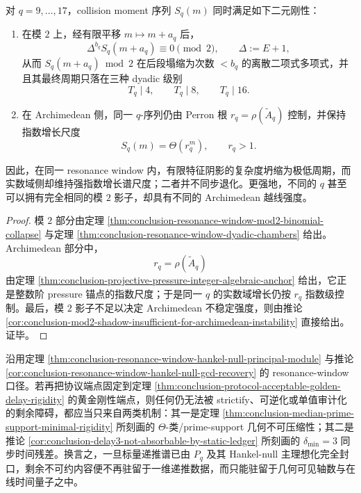 \begin{theorem}\label{thm:conclusion-resonance-window-archimedean-mod2-complexity-splitting}
对 \(q=9,\dots,17\)，collision moment 序列 \(S_q(m)\) 同时满足如下二元刚性：
\begin{enumerate}
\item 在模 \(2\) 上，经有限平移 \(m\mapsto m+a_q\) 后，
\[
\Delta^{b_q}S_q(m+a_q)\equiv 0\pmod 2,
\qquad
\Delta:=E+1,
\]
从而 \(S_q(m+a_q)\bmod 2\) 在后段塌缩为次数 \(<b_q\) 的离散二项式多项式，并且其最终周期只落在三种 dyadic 级别
\[
T_q\mid 4,\qquad T_q\mid 8,\qquad T_q\mid 16.
\]
\item 在 Archimedean 侧，同一 \(q\)-序列仍由 Perron 根 \(r_q=\rho(\widetilde A_q)\) 控制，并保持指数增长尺度
\[
S_q(m)=\Theta(r_q^m),
\qquad
r_q>1.
\]
\end{enumerate}
因此，在同一 resonance window 内，有限特征阴影的复杂度坍缩为极低周期，而实数域侧却维持强指数增长谱尺度；二者并不同步退化。更强地，不同的 \(q\) 甚至可以拥有完全相同的模 \(2\) 影子，却具有不同的 Archimedean 越线强度。
\end{theorem}
\begin{proof}
模 \(2\) 部分由定理 \ref{thm:conclusion-resonance-window-mod2-binomial-collapse} 与定理 \ref{thm:conclusion-resonance-window-dyadic-chambers} 给出。Archimedean 部分中，
\[
r_q=\rho(\widetilde A_q)
\]
由定理 \ref{thm:conclusion-projective-pressure-integer-algebraic-anchor} 给出，它正是整数阶 pressure 锚点的指数尺度；于是同一 \(q\) 的实数域增长仍按 \(r_q\) 指数级控制。最后，模 \(2\) 影子不足以决定 Archimedean 不稳定强度，则由推论 \ref{cor:conclusion-mod2-shadow-insufficient-for-archimedean-instability} 直接给出。证毕。
\end{proof}

\begin{conjecture}\label{conj:conclusion-golden-protocol-residual-geometry-time-closure}
沿用定理 \ref{thm:conclusion-resonance-window-hankel-null-principal-module} 与推论 \ref{cor:conclusion-resonance-window-hankel-null-gcd-recovery} 的 resonance-window 口径。若再把协议端点固定到定理 \ref{thm:conclusion-protocol-acceptable-golden-delay-rigidity} 的黄金刚性端点，则任何仍无法被 strictify、可逆化或单值审计化的剩余障碍，都应当只来自两类机制：其一是定理 \ref{thm:conclusion-median-prime-support-minimal-rigidity} 所刻画的 \(\Theta\)-类/prime-support 几何不可压缩性；其二是推论 \ref{cor:conclusion-delay3-not-absorbable-by-static-ledger} 所刻画的 \(\delta_{\min}=3\) 同步时间残差。换言之，一旦标量递推谱已由 \(P_q\) 及其 Hankel-null 主理想化完全封口，剩余不可约内容便不再驻留于一维递推数据，而只能驻留于几何可见轴数与在线时间量子之中。
\end{conjecture}

